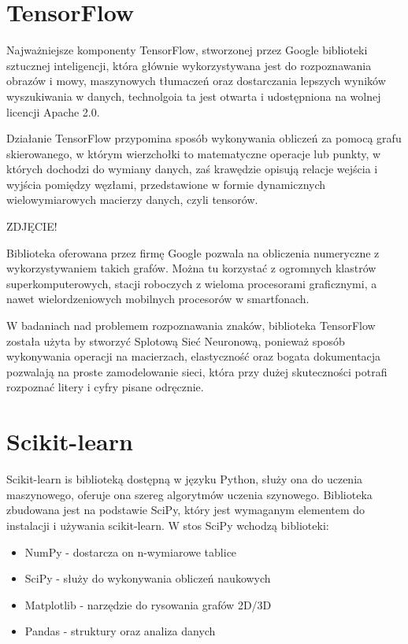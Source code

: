 \documentclass[brudnopis]{xmgr}
\begin{document}
\section{TensorFlow}

Najważniejsze komponenty TensorFlow, stworzonej przez Google biblioteki sztucznej inteligencji, która głównie wykorzystywana jest do rozpoznawania obrazów i mowy, maszynowych tłumaczeń oraz dostarczania lepszych wyników wyszukiwania w danych, technolgoia ta jest otwarta i udostępniona na wolnej licencji Apache 2.0.

Działanie TensorFlow przypomina sposób wykonywania obliczeń za pomocą grafu skierowanego, w którym wierzchołki to matematyczne operacje lub punkty, w których dochodzi do wymiany danych, zaś krawędzie opisują relacje wejścia i wyjścia pomiędzy węzłami, przedstawione w formie dynamicznych wielowymiarowych macierzy danych, czyli tensorów.

ZDJĘCIE!

Biblioteka oferowana przez firmę Google pozwala na obliczenia numeryczne z wykorzystywaniem takich grafów. Można tu korzystać z ogromnych klastrów superkomputerowych, stacji roboczych z wieloma procesorami graficznymi, a nawet wielordzeniowych mobilnych procesorów w smartfonach.

W badaniach nad problemem rozpoznawania znaków, biblioteka TensorFlow została użyta by stworzyć Splotową  Sieć Neuronową, ponieważ sposób wykonywania operacji na macierzach, elastyczność oraz bogata dokumentacja pozwalają na proste zamodelowanie sieci, która przy dużej skuteczności potrafi rozpoznać litery i cyfry pisane odręcznie.

\section{Scikit-learn}

Scikit-learn is biblioteką dostępną w języku Python, służy ona do uczenia maszynowego, oferuje ona szereg algorytmów uczenia szynowego. Biblioteka zbudowana jest na podstawie SciPy, który jest wymaganym elementem do instalacji i używania scikit-learn. W stos SciPy wchodzą biblioteki:

\begin{itemize}
\item
NumPy - dostarcza on n-wymiarowe tablice
\item
SciPy - służy do wykonywania obliczeń naukowych
\item
Matplotlib - narzędzie do rysowania grafów 2D/3D
\item
Pandas - struktury oraz analiza danych
\end{itemize}
\end{document}
